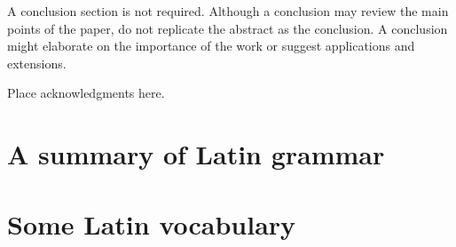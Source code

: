\documentclass{ifacconf}
\begin{document}
A conclusion section is not required. Although a conclusion may review
the main points of the paper, do not replicate the abstract as the
conclusion. A conclusion might elaborate on the importance of the work
or suggest applications and extensions.

\begin{ack}
Place acknowledgments here.
\end{ack}

                                                   







\appendix
\section{A summary of Latin grammar}    %
\section{Some Latin vocabulary}              %
\end{document}

